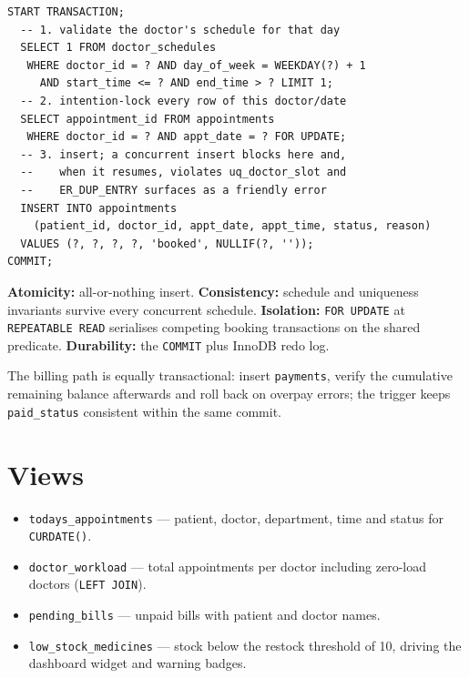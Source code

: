 \documentclass[11pt]{article}
\begin{document}
\begin{lstlisting}
START TRANSACTION;
  -- 1. validate the doctor's schedule for that day
  SELECT 1 FROM doctor_schedules
   WHERE doctor_id = ? AND day_of_week = WEEKDAY(?) + 1
     AND start_time <= ? AND end_time > ? LIMIT 1;
  -- 2. intention-lock every row of this doctor/date
  SELECT appointment_id FROM appointments
   WHERE doctor_id = ? AND appt_date = ? FOR UPDATE;
  -- 3. insert; a concurrent insert blocks here and,
  --    when it resumes, violates uq_doctor_slot and
  --    ER_DUP_ENTRY surfaces as a friendly error
  INSERT INTO appointments
    (patient_id, doctor_id, appt_date, appt_time, status, reason)
  VALUES (?, ?, ?, ?, 'booked', NULLIF(?, ''));
COMMIT;
\end{lstlisting}

\textbf{Atomicity:} all-or-nothing insert. \textbf{Consistency:} schedule and
uniqueness invariants survive every concurrent schedule. \textbf{Isolation:}
\texttt{FOR UPDATE} at \texttt{REPEATABLE READ} serialises competing booking
transactions on the shared predicate. \textbf{Durability:} the \texttt{COMMIT}
plus InnoDB redo log.

The billing path is equally transactional: insert \texttt{payments}, verify
the cumulative remaining balance afterwards and roll back on overpay errors;
the trigger keeps \texttt{paid\_status} consistent within the same commit.

\section{Views}
\begin{itemize}
  \item \texttt{todays\_appointments} --- patient, doctor, department, time
        and status for \texttt{CURDATE()}.
  \item \texttt{doctor\_workload} --- total appointments per doctor including
        zero-load doctors (\texttt{LEFT JOIN}).
  \item \texttt{pending\_bills} --- unpaid bills with patient and doctor names.
  \item \texttt{low\_stock\_medicines} --- stock below the restock threshold
        of 10, driving the dashboard widget and warning badges.
\end{itemize}

\end{document}
